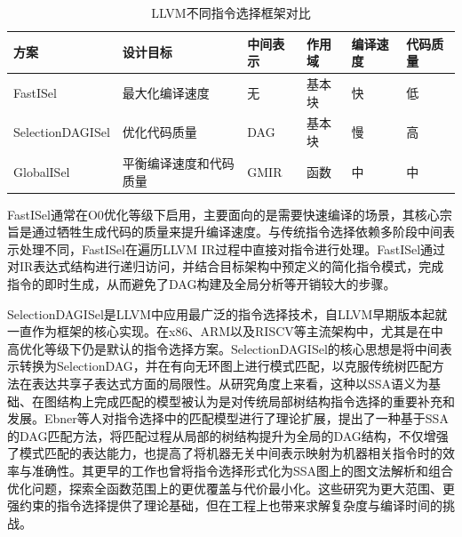 \begin{table}[htbp]
	\centering
	\caption{LLVM不同指令选择框架对比}
	\label{tab:isel_compare}
	
	\renewcommand{\arraystretch}{1.2}
	{\footnotesize
		\begin{tabularx}{\linewidth}{
				>{\raggedright\arraybackslash}m{2.6cm}
				>{\centering\arraybackslash}m{3.6cm}
				>{\centering\arraybackslash}X
				>{\centering\arraybackslash}X
				>{\centering\arraybackslash}X
				>{\centering\arraybackslash}X
			}
			\toprule
			方案 & 设计目标 & 中间表示 & 作用域 & 编译速度 & 代码质量 \\
			\midrule
			FastISel & 最大化编译速度 & 无 & 基本块 & 快 & 低 \\
			SelectionDAGISel & 优化代码质量 & DAG & 基本块 & 慢 & 高 \\
			GlobalISel & 平衡编译速度和代码质量 & GMIR & 函数 & 中 & 中 \\
			\bottomrule
		\end{tabularx}
	}
\end{table}

\par

FastISel通常在O0优化等级下启用，主要面向的是需要快速编译的场景，其核心宗旨是通过牺牲生成代码的质量来提升编译速度。与传统指令选择依赖多阶段中间表示处理不同，FastISel在遍历LLVM IR过程中直接对指令进行处理。FastISel通过对IR表达式结构进行递归访问，并结合目标架构中预定义的简化指令模式，完成指令的即时生成，从而避免了DAG构建及全局分析等开销较大的步骤。

\par

SelectionDAGISel是LLVM中应用最广泛的指令选择技术，自LLVM早期版本起就一直作为框架的核心实现。在x86、ARM以及RISCV等主流架构中，尤其是在中高优化等级下仍是默认的指令选择方案。SelectionDAGISel的核心思想是将中间表示转换为SelectionDAG，并在有向无环图上进行模式匹配，以克服传统树匹配方法在表达共享子表达式方面的局限性。从研究角度上来看，这种以SSA语义为基础、在图结构上完成匹配的模型被认为是对传统局部树结构指令选择的重要补充和发展。Ebner等人\cite{Ebner2021}对指令选择中的匹配模型进行了理论扩展，提出了一种基于SSA的DAG匹配方法，将匹配过程从局部的树结构提升为全局的DAG结构，不仅增强了模式匹配的表达能力，也提高了将机器无关中间表示映射为机器相关指令时的效率与准确性。其更早的工作也曾将指令选择形式化为SSA图上的图文法解析和组合优化问题，探索全函数范围上的更优覆盖与代价最小化\cite{ebner2008generalized}。这些研究为更大范围、更强约束的指令选择提供了理论基础，但在工程上也带来求解复杂度与编译时间的挑战。


